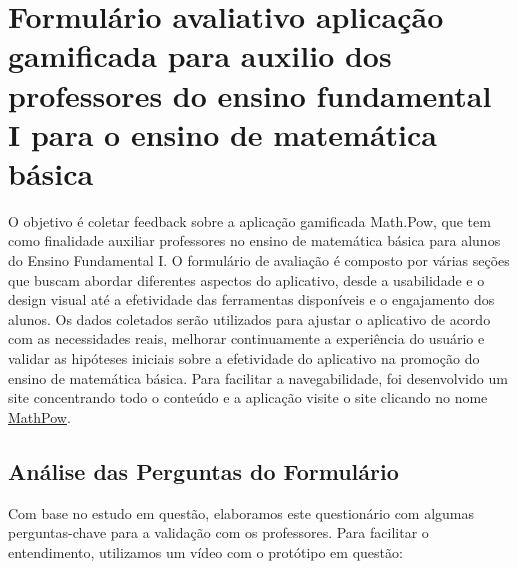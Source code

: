 \section{Formulário avaliativo  aplicação gamificada para auxilio dos professores do ensino fundamental I para o ensino de matemática básica}

O objetivo é coletar feedback sobre a aplicação gamificada Math.Pow, que tem como finalidade auxiliar professores no ensino de matemática básica para alunos do Ensino Fundamental I. O formulário de avaliação é composto por várias seções que buscam abordar diferentes aspectos do aplicativo, desde a usabilidade e o design visual até a efetividade das ferramentas disponíveis e o engajamento dos alunos. Os dados coletados serão utilizados para ajustar o aplicativo de acordo com as necessidades reais, melhorar continuamente a experiência do usuário e validar as hipóteses iniciais sobre a efetividade do aplicativo na promoção do ensino de matemática básica. Para facilitar a navegabilidade, foi desenvolvido um site concentrando todo o conteúdo e a aplicação visite o site clicando no nome \href{https://mathpow.vercel.app/}{MathPow}.

\subsection{Análise das Perguntas do Formulário}

Com base no estudo em questão, elaboramos este questionário com algumas perguntas-chave para a validação com os professores. Para facilitar o entendimento, utilizamos um vídeo com o protótipo em questão:

